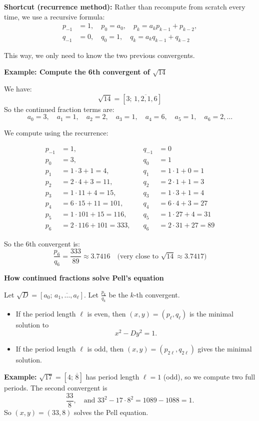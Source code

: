 \documentclass[11pt]{article}
\begin{document}
\smallskip
\textbf{Shortcut (recurrence method):} Rather than recompute from scratch every time, we use a recursive formula:
\[
\begin{aligned}
p_{-1} &= 1,\quad p_0 = a_0, \quad p_k = a_k p_{k-1} + p_{k-2}, \\
q_{-1} &= 0,\quad q_0 = 1, \quad q_k = a_k q_{k-1} + q_{k-2}
\end{aligned}
\]

This way, we only need to know the two previous convergents.

\bigskip
\noindent
\textbf{Example: Compute the 6th convergent of \( \sqrt{14} \)}

We have:
\[
\sqrt{14} = [3;\, \overline{1,2,1,6}]
\]
So the continued fraction terms are:
\[
a_0 = 3,\quad a_1 = 1,\quad a_2 = 2,\quad a_3 = 1,\quad a_4 = 6,\quad a_5 = 1,\quad a_6 = 2,\dots
\]

We compute using the recurrence:

\[
\begin{aligned}
p_{-1} &= 1,\quad &q_{-1} &= 0 \\
p_0 &= 3,\quad &q_0 &= 1 \\
p_1 &= 1 \cdot 3 + 1 = 4,\quad &q_1 &= 1 \cdot 1 + 0 = 1 \\
p_2 &= 2 \cdot 4 + 3 = 11,\quad &q_2 &= 2 \cdot 1 + 1 = 3 \\
p_3 &= 1 \cdot 11 + 4 = 15,\quad &q_3 &= 1 \cdot 3 + 1 = 4 \\
p_4 &= 6 \cdot 15 + 11 = 101,\quad &q_4 &= 6 \cdot 4 + 3 = 27 \\
p_5 &= 1 \cdot 101 + 15 = 116,\quad &q_5 &= 1 \cdot 27 + 4 = 31 \\
p_6 &= 2 \cdot 116 + 101 = 333,\quad &q_6 &= 2 \cdot 31 + 27 = 89
\end{aligned}
\]

So the 6th convergent is:
\[
\frac{p_6}{q_6} = \frac{333}{89} \approx 3.7416 \quad \text{(very close to } \sqrt{14} \approx 3.7417\text{)}
\]

\smallskip
\noindent
\textbf{How continued fractions solve Pell’s equation}

Let \( \sqrt{D} = [a_0;\, \overline{a_1,\dots,a_\ell}] \). Let \( \frac{p_k}{q_k} \) be the $k$-th convergent.

\begin{itemize}
  \item If the period length \( \ell \) is even, then \( (x, y) = (p_\ell, q_\ell) \) is the minimal solution to
  \[
  x^2 - D y^2 = 1.
  \]
  \item If the period length \( \ell \) is odd, then \( (x, y) = (p_{2\ell}, q_{2\ell}) \) gives the minimal solution.
\end{itemize}

\textbf{Example:} \( \sqrt{17} = [4;\, \overline{8}] \) has period length \( \ell = 1 \) (odd), so we compute two full periods. The second convergent is
\[
\frac{33}{8}, \quad \text{and } 33^2 - 17 \cdot 8^2 = 1089 - 1088 = 1.
\]
So \( (x, y) = (33, 8) \) solves the Pell equation.
\end{document}
